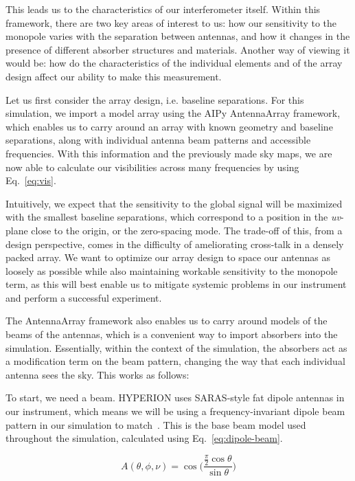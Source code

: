 This leads us to the characteristics of our interferometer itself. Within this 
framework, there are two key areas of interest to us: how our sensitivity to 
the monopole varies with the separation between antennas, and how it changes in 
the presence of different absorber structures and materials. Another way of 
viewing it would be: how do the characteristics of the individual elements and 
of the array design affect our ability to make this measurement.

Let us first consider the array design, i.e. baseline separations. For this 
simulation, we import a model array using the AIPy AntennaArray framework, 
which enables us to carry around an array with known geometry and baseline 
separations, along with individual antenna beam patterns and accessible 
frequencies. With this information and the previously made sky maps, we are now 
able to calculate our visibilities across many frequencies by using 
Eq.~\eqref{eq:vis}.

Intuitively, we expect that the sensitivity to the global signal will be 
maximized with the smallest baseline separations, which correspond to a 
position in the \emph{uv}-plane close to the origin, or the zero-spacing mode.  
The trade-off of this, from a design perspective, comes in the difficulty of 
ameliorating cross-talk in a densely packed array. We want to optimize our 
array design to space our antennas as loosely as possible while also 
maintaining workable sensitivity to the monopole term, as this will best enable 
us to mitigate systemic problems in our instrument and perform a successful 
experiment.

The AntennaArray framework also enables us to carry around models of the beams 
of the antennas, which is a convenient way to import absorbers into the 
simulation. Essentially, within the context of the simulation, the absorbers 
act as a modification term on the beam pattern, changing the way that each 
individual antenna sees the sky. This works as follows:

To start, we need a beam. HYPERION uses SARAS-style fat dipole antennas in our 
instrument, which means we will be using a frequency-invariant dipole beam 
pattern in our simulation to match~\citep{patra2013}. This is the base beam 
model used throughout the simulation, calculated using 
Eq.~\eqref{eq:dipole-beam}.

\begin{equation}
    \label{eq:dipole-beam}
    A(\theta, \phi, \nu) = \cos\Big(\frac{\frac{\pi}{2} 
    \cos{\theta}}{\sin{\theta}}\Big)
\end{equation}

